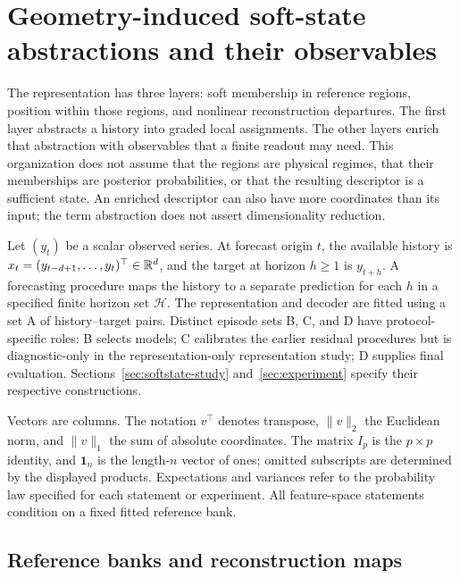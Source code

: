 \section{Geometry-induced soft-state abstractions and their observables}
\label{sec:reconstruction-method}
\label{sec:reconstruction-mechanism}

The representation has three layers: soft membership in reference
regions, position within those regions, and nonlinear reconstruction
departures. The first layer abstracts a history into graded local
assignments. The other layers enrich that abstraction with observables
that a finite readout may need. This organization does not assume that
the regions are physical regimes, that their memberships are posterior
probabilities, or that the resulting descriptor is a sufficient state.
An enriched descriptor can also have more coordinates than its input;
the term abstraction does not assert dimensionality reduction.

Let $(y_t)$ be a scalar observed series. At forecast origin $t$, the
available history is $x_t=(y_{t-d+1},\ldots,y_t)^\top\in\mathbb{R}^d$,
and the target at horizon $h\geq1$ is $y_{t+h}$. A forecasting procedure
maps the history to a separate prediction for each $h$ in a specified
finite horizon set $\mathcal H$. The representation and decoder are
fitted using a set A of history--target pairs. Distinct episode sets B,
C, and D have protocol-specific roles: B selects models; C calibrates
the earlier residual procedures but is diagnostic-only in the representation-only
representation study; D supplies final evaluation.
Sections~\ref{sec:softstate-study} and~\ref{sec:experiment} specify
their respective constructions.

Vectors are columns. The notation $v^\top$ denotes transpose,
$\|v\|_2$ the Euclidean norm, and $\|v\|_1$ the sum of absolute
coordinates. The matrix $I_p$ is the $p\times p$ identity, and
$\mathbf1_n$ is the length-$n$ vector of ones; omitted subscripts are
determined by the displayed products. Expectations and variances refer
to the probability law specified for each statement or experiment.
All feature-space statements condition on a fixed fitted reference bank.

\subsection{Reference banks and reconstruction maps}


